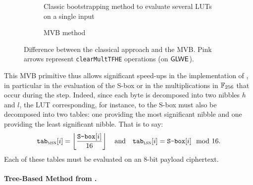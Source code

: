 \begin{figure}
	\centering
	\begin{subfigure}[t]{\linewidth}
		\centering
		\mvbFigureA %
		\caption{Classic bootstrapping method to evaluate several LUTs on a single input}
		\label{fig:mvbA}
	\end{subfigure}
	
	\vspace{1.5em} %
	
	\begin{subfigure}[t]{\textwidth}
		\centering
		\mvbFigureB %
		\caption{MVB method}
		\label{fig:mvbB}
	\end{subfigure}
	
	\caption{Difference between the classical approach and the MVB. Pink arrows represent \texttt{clearMultTFHE} operations (on $\textsf{GLWE}$).}
	\label{fig:mvb}
\end{figure}

This MVB primitive thus allows significant speed-ups in the implementation of \cite{DBLP:conf/wahc/TramaCBS23}, in particular in the evaluation of the S-box or in the multiplications in $\mathbb{F}_{256}$ that occur during the \MixColumns step. Indeed, since each byte is decomposed into two nibbles $h$ and $l$, the LUT corresponding, for instance, to the S-box must also be decomposed into two tables: one providing the most significant nibble and one providing the least significant nibble. That is to say: 
$$
\texttt{tab}_{\textsc{msn}}[i] = \left\lfloor \frac{\texttt{S-box}[i]}{16} \right\rfloor \quad \text{and} \quad \texttt{tab}_{\textsc{lsn}}[i] = \texttt{S-box}[i] \mod 16.
$$
Each of these tables must be evaluated on an 8-bit payload ciphertext. 


\paragraph{Tree-Based Method from \cite{DBLP:conf/wahc/TramaCBS23}.}
\label{prim:tbb}

